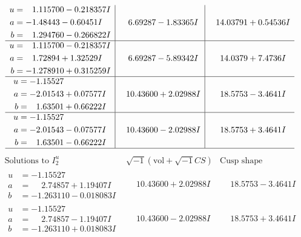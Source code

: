 \documentclass[1p]{elsarticle_modified}
\theoremstyle{definition}
\newcommand{\I}{\sqrt{-1}}
\begin{document}
$$\begin{array}{c|c|c}
\begin{aligned}
u &= \phantom{-}1.115700 - 0.218357 I \\
a &= -1.48443 - 0.60451 I \\
b &= \phantom{-}1.294760 - 0.266822 I\end{aligned}
 & \phantom{-}6.69287 - 1.83365 I & \phantom{-}14.03791 + 0.54536 I \\ \hline\begin{aligned}
u &= \phantom{-}1.115700 - 0.218357 I \\
a &= \phantom{-}1.72894 + 1.32529 I \\
b &= -1.278910 + 0.315259 I\end{aligned}
 & \phantom{-}6.69287 - 5.89342 I & \phantom{-}14.0379 + 7.4736 I \\ \hline\begin{aligned}
u &= -1.15527\phantom{ +0.000000I} \\
a &= -2.01543 + 0.07577 I \\
b &= \phantom{-}1.63501 + 0.66222 I\end{aligned}
 & \phantom{-}10.43600 + 2.02988 I & \phantom{-}18.5753 - 3.4641 I \\ \hline\begin{aligned}
u &= -1.15527\phantom{ +0.000000I} \\
a &= -2.01543 - 0.07577 I \\
b &= \phantom{-}1.63501 - 0.66222 I\end{aligned}
 & \phantom{-}10.43600 - 2.02988 I & \phantom{-}18.5753 + 3.4641 I\\
 \hline 
 \end{array}$$\newpage$$\begin{array}{c|c|c}  
\text{Solutions to }I^u_{2}& \I (\text{vol} + \sqrt{-1}CS) & \text{Cusp shape}\\
 \hline 
\begin{aligned}
u &= -1.15527\phantom{ +0.000000I} \\
a &= \phantom{-}2.74857 + 1.19407 I \\
b &= -1.263110 - 0.018083 I\end{aligned}
 & \phantom{-}10.43600 + 2.02988 I & \phantom{-}18.5753 - 3.4641 I \\ \hline\begin{aligned}
u &= -1.15527\phantom{ +0.000000I} \\
a &= \phantom{-}2.74857 - 1.19407 I \\
b &= -1.263110 + 0.018083 I\end{aligned}
 & \phantom{-}10.43600 - 2.02988 I & \phantom{-}18.5753 + 3.4641 I \\ \hline\begin{aligned}

\end{aligned}
\end{array}$$
\end{document}
